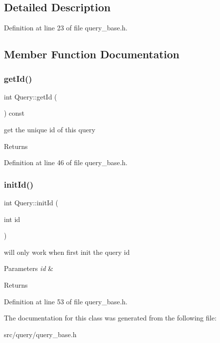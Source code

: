 \subsection{Detailed Description}


Definition at line 23 of file query\+\_\+base.\+h.



\subsection{Member Function Documentation}
\mbox{\label{class_query_af59c2164a6ccfe1ad6cc0c6b8ae33938}} 
\subsubsection{\texorpdfstring{get\+Id()}{getId()}}
{\footnotesize\ttfamily int Query\+::get\+Id (\begin{DoxyParamCaption}{ }\end{DoxyParamCaption}) const\hspace{0.3cm}{\ttfamily [inline]}}

get the unique id of this query \begin{DoxyReturn}{Returns}

\end{DoxyReturn}


Definition at line 46 of file query\+\_\+base.\+h.

\mbox{\label{class_query_a162c2530d5a3dc048759ec12788b5c90}} 
\subsubsection{\texorpdfstring{init\+Id()}{initId()}}
{\footnotesize\ttfamily int Query\+::init\+Id (\begin{DoxyParamCaption}\item[{int}]{id }\end{DoxyParamCaption})\hspace{0.3cm}{\ttfamily [inline]}}

will only work when first init the query id 
\begin{DoxyParams}{Parameters}
{\em id} & \\
\hline
\end{DoxyParams}
\begin{DoxyReturn}{Returns}

\end{DoxyReturn}


Definition at line 53 of file query\+\_\+base.\+h.



The documentation for this class was generated from the following file\+:\begin{DoxyCompactItemize}
\item 
src/query/query\+\_\+base.\+h\end{DoxyCompactItemize}
